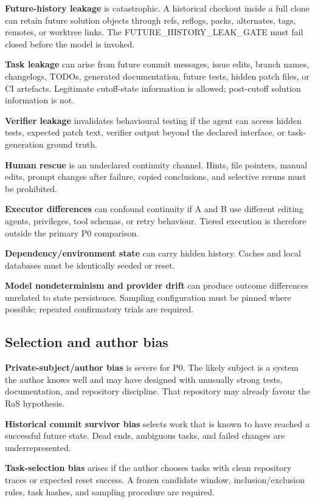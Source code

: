 \textbf{Future-history leakage} is catastrophic. A historical checkout inside a full clone can retain future solution objects through refs, reflogs, packs, alternates, tags, remotes, or worktree links. The FUTURE_HISTORY_LEAK_GATE must fail closed before the model is invoked.

\textbf{Task leakage} can arise from future commit messages, issue edits, branch names, changelogs, TODOs, generated documentation, future tests, hidden patch files, or CI artefacts. Legitimate cutoff-state information is allowed; post-cutoff solution information is not.

\textbf{Verifier leakage} invalidates behavioural testing if the agent can access hidden tests, expected patch text, verifier output beyond the declared interface, or task-generation ground truth.

\textbf{Human rescue} is an undeclared continuity channel. Hints, file pointers, manual edits, prompt changes after failure, copied conclusions, and selective reruns must be prohibited.

\textbf{Executor differences} can confound continuity if A and B use different editing agents, privileges, tool schemas, or retry behaviour. Tiered execution is therefore outside the primary P0 comparison.

\textbf{Dependency/environment state} can carry hidden history. Caches and local databases must be identically seeded or reset.

\textbf{Model nondeterminism and provider drift} can produce outcome differences unrelated to state persistence. Sampling configuration must be pinned where possible; repeated confirmatory trials are required.

\subsection{Selection and author bias}

\textbf{Private-subject/author bias} is severe for P0. The likely subject is a system the author knows well and may have designed with unusually strong tests, documentation, and repository discipline. That repository may already favour the RaS hypothesis.

\textbf{Historical commit survivor bias} selects work that is known to have reached a successful future state. Dead ends, ambiguous tasks, and failed changes are underrepresented.

\textbf{Task-selection bias} arises if the author chooses tasks with clean repository traces or expected reset success. A frozen candidate window, inclusion/exclusion rules, task hashes, and sampling procedure are required.

